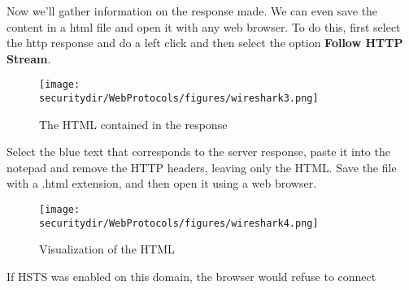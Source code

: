 \begin{Exercise}[label={webprotocols-http-practs}]
Now we'll gather information on the response made. We can even save the content in a html file and open it with any web browser. To do this, first select the http response and do a left click and then select the option \textbf{Follow HTTP Stream}. 
\begin{figure}[htb]
	\begin{centering}
		\texttt{[image: \\securitydir/WebProtocols/figures/wireshark3.png]}
		\par\end{centering}
	\caption{\label{fig:wireshark1} The HTML contained in the response}
\end{figure}
Select the blue text that corresponds to the server response, paste it into the notepad and remove the HTTP headers, leaving only the HTML. Save the file with a .html extension, and then open it using a web browser.
\begin{figure}[htb]
	\begin{centering}
		\texttt{[image: \\securitydir/WebProtocols/figures/wireshark4.png]}
		\par\end{centering}
	\caption{\label{fig:wireshark1} Visualization of the HTML}
\end{figure}

\end{Exercise}

\begin{Answer}[ref={webprotocols-http-practs}]
\end{Answer}

If HSTS was enabled on this domain, the browser would refuse to connect 